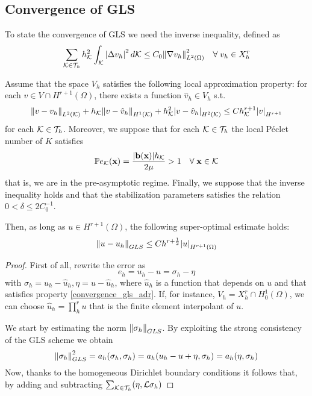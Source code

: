 \subsection{Convergence of GLS}
To state the convergence of GLS we need the inverse inequality, defined as
\begin{equation}
    \sum_{\mathcal{K}\in\mathcal{T}_h} h^2_{\mathcal{K}} \int_{\mathcal{K}} \abs{\Delta v_h}^2 \, d\mathcal{K} \leq C_0 \norm{\nabla v_h}_{L^2(\Omega)}^2 \quad \forall \; v_h \in X_h^r
    \label{inverse_inequality_adr}
\end{equation}
\begin{theorem}
    Assume that the space \(V_h\) satisfies the following local approximation property: for each \(v \in V \cap H^{r+1}(\Omega)\), there exists a function \(\hat{v}_h \in V_h\) s.t. 
    \begin{equation}
        \norm{v-v_h}_{L^2(\mathcal{K})} + h_{\mathcal{K}} \norm{v-\hat{v}_h}_{H^1(\mathcal{K})} + h^2_{\mathcal{K}} \abs{v-\hat{v}_h}_{H^2(\mathcal{K})} \leq Ch^{r+1}_{\mathcal{K}} \abs{v}_{H^{r+1}}
        \label{convergence_gls_adr}
    \end{equation}
    for each \(\mathcal{K}\in\mathcal{T}_h\). Moreover, we suppose that for each \(\mathcal{K}\in\mathcal{T}_h\) the local Péclet number of \(K\) satisfies 
    \begin{equation}
        \mathbb{P}e_{\mathcal{K}} (\textbf{x}) = \frac{\abs{\textbf{b}(\textbf{x})}h_{\mathcal{K}}}{2\mu} > 1 \quad \forall \; \textbf{x} \in \mathcal{K}
        \label{local_peclet_adr}
    \end{equation}
    that is, we are in the pre-asymptotic regime. Finally, we suppose that the inverse inequality holds and that the stabilization parameters satisfies the relation \(0 < \delta \leq 2C_0^{-1}\).

    Then, as long as \(u \in H^{r+1}(\Omega)\), the following super-optimal estimate holds:
    \begin{equation}
        \norm{u-u_h}_{GLS} \leq Ch^{r+\frac{1}{2}} \abs{u}_{H^{r+1}(\Omega)}        
        \label{super-estimate_adr}
    \end{equation}
\end{theorem}
\begin{proof}
    First of all, rewrite the error as 
    \begin{equation}
        e_h = u_h - u = \sigma_h - \eta
        \label{error_rewrite_adr}
    \end{equation}
    with \(\sigma_h = u_h - \hat{u}_h, \eta = u - \hat{u}_h\), where \(\hat{u}_h\) is a function that depends on \(u\) and that satisfies property \eqref{convergence_gls_adr}. If, for instance, \(V_h = X_h^r \cap H^1_0(\Omega)\), we can choose \(\hat{u}_h = \prod_{h}^{r} u\) that is the finite element interpolant of \(u\). 

    We start by estimating the norm \(\norm{\sigma_h}_{GLS}\). By exploiting the strong consistency of the GLS scheme we obtain 
    \[
        \norm{\sigma_h}^2_{GLS} = a_h(\sigma_h, \sigma_h) = a_h(u_h - u +\eta, \sigma_h) = a_h(\eta, \sigma_h)
    \]
    Now, thanks to the homogeneous Dirichlet boundary conditions it follows that, by adding and subtracting \(\sum_{\mathcal{K}\in\mathcal{T}_h}(\eta, \mathcal{L}\sigma_h)\)
\end{proof}
